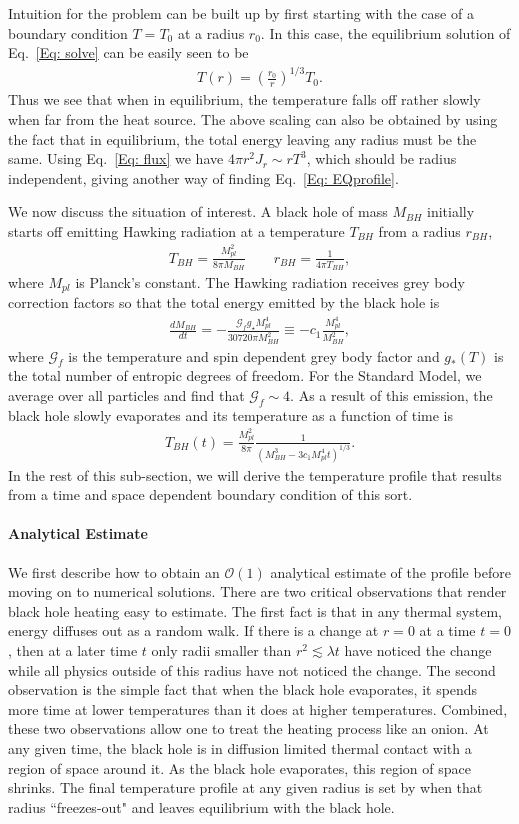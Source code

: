 \documentclass[superscriptaddress,groupedaddress,nofootnoteinbib,11pt]{article}
\newcommand\eea{\end{eqnarray}}
\newcommand\bea{\begin{eqnarray}}
\newcommand{\mpl}{M_{pl}}
\begin{document}
Intuition for the problem can be built up by first starting with the case of a boundary condition $T = T_0$ at a radius $r_0$.  In this case, the equilibrium solution of Eq.~\ref{Eq: solve} can be easily seen to be
\bea
\label{Eq: EQprofile}
T(r) = \left( \frac{r_0}{r} \right )^{1/3} T_0.
\eea
Thus we see that when in equilibrium, the temperature falls off rather slowly when far from the heat source.
The above scaling can also be obtained by using the fact that in equilibrium, the total energy leaving any radius must be the same.  Using Eq.~\ref{Eq: flux} we have $4 \pi r^2 J_r \sim r T^3$, which should be radius independent, giving another way of finding Eq.~\ref{Eq: EQprofile}.

We now discuss the situation of interest.  A black hole of mass $M_{BH}$ initially starts off emitting Hawking radiation at a temperature $T_{BH}$ from a radius $r_{BH}$,
\bea
T_{BH} = \frac{\mpl^2}{8 \pi M_{BH}} \qquad r_{BH} = \frac{1}{4 \pi T_{BH}},
\eea
where $\mpl$ is Planck's constant.  The Hawking radiation receives grey body correction factors so that the total energy emitted by the black hole is
\bea
\frac{d M_{BH}}{dt} = - \frac{\mathcal{G}_f g_{\star} \mpl^4}{30720 \pi M_{BH}^2} \equiv -c_1 \frac{\mpl^4}{M_{BH}^2},
\eea
where $\mathcal{G}_f$ is the temperature and spin dependent grey body factor and $g_*(T)$ is the total number of entropic degrees of freedom.  For the Standard Model,  we average over all particles and find that $\mathcal{G}_f \sim 4$.  As a result of this emission, the black hole slowly evaporates and its temperature as a function of time is
\bea
\label{Eq: tbh of t}
T_{BH}(t) = \frac{\mpl^2}{8 \pi} \frac{1}{\left ( M_{BH}^3 - 3 c_1 \mpl^4 t \right )^{1/3}}.
\eea
In the rest of this sub-section, we will derive the temperature profile that results from a time and space dependent boundary condition of this sort.


\paragraph{Analytical Estimate}\label{Sec:anaheating}

We first describe how to obtain an $\mathcal{O}(1)$ analytical estimate of the profile before moving on to numerical solutions.  
There are two critical observations that render black hole heating easy to estimate.
The first fact is that in any thermal system, energy diffuses out as a random walk.
If there is a change at $r=0$ at a time $t=0$, then at a later time $t$ only radii smaller than $r^2 \lesssim \lambda t$ have noticed the change while all physics outside of this radius have not noticed the change.
The second observation is the simple fact that when the black hole evaporates, it spends more time at lower temperatures than it does at higher temperatures.
Combined, these two observations allow one to treat the heating process like an onion.  At any given time, the black hole is in diffusion limited thermal contact with a region of space around it.  As the black hole evaporates, this region of space shrinks.  The final temperature profile at any given radius is set by when that radius ``freezes-out" and leaves equilibrium with the black hole.
\end{document}
